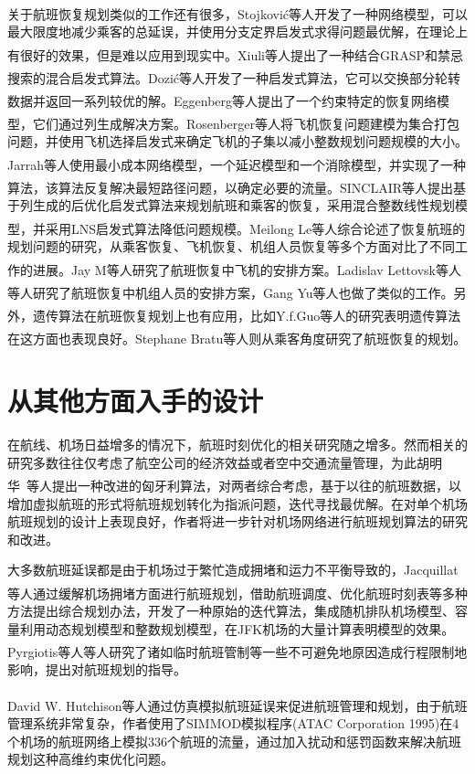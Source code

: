 \documentclass[runningheads]{llncs}
\newcommand{\upcite}[1]{\textsuperscript{\textsuperscript{\cite{#1}}}}
\begin{document}
关于航班恢复规划类似的工作还有很多，Stojković等人\upcite{ref_article26}开发了一种网络模型，可以最大限度地减少乘客的总延误，并使用分支定界启发式求得问题最优解，在理论上有很好的效果，但是难以应用到现实中。Xiuli等人\upcite{ref_article27}提出了一种结合GRASP和禁忌搜索的混合启发式算法。Dozić等人\upcite{ref_article28}开发了一种启发式算法，它可以交换部分轮转数据并返回一系列较优的解。Eggenberg等人\upcite{ref_article29}提出了一个约束特定的恢复网络模型，它们通过列生成解决方案。Rosenberger等人\upcite{ref_article30}将飞机恢复问题建模为集合打包问题，并使用飞机选择启发式来确定飞机的子集以减小整数规划问题规模的大小。Jarrah等人\upcite{ref_article31}使用最小成本网络模型，一个延迟模型和一个消除模型，并实现了一种算法，该算法反复解决最短路径问题，以确定必要的流量。SINCLAIR等人\upcite{ref_article4}提出基于列生成的后优化启发式算法来规划航班和乘客的恢复，采用混合整数线性规划模型，并采用LNS启发式算法降低问题规模。Meilong Le等人\upcite{ref_article8}综合论述了恢复航班的规划问题的研究，从乘客恢复、飞机恢复、机组人员恢复等多个方面对比了不同工作的进展。Jay M等人\upcite{ref_article37}研究了航班恢复中飞机的安排方案。Ladislav Lettovsk等人\upcite{ref_article38}等人研究了航班恢复中机组人员的安排方案，Gang Yu等人\upcite{ref_article39}也做了类似的工作。另外，遗传算法在航班恢复规划上也有应用，比如Y.f.Guo\upcite{ref_article40}等人的研究表明遗传算法在这方面也表现良好。Stephane Bratu等人\upcite{ref_article41}则从乘客角度研究了航班恢复的规划。

\section{从其他方面入手的设计}
在航线、机场日益增多的情况下，航班时刻优化的相关研究随之增多。然而相关的研究多数往往仅考虑了航空公司的经济效益或者空中交通流量管理，为此胡明华\ 等人提出一种改进的匈牙利算法\upcite{ref_article1}，对两者综合考虑，基于以往的航班数据，以增加虚拟航班的形式将航班规划转化为指派问题，迭代寻找最优解。在对单个机场航班规划的设计上表现良好，作者将进一步针对机场网络进行航班规划算法的研究和改进。

大多数航班延误都是由于机场过于繁忙造成拥堵和运力不平衡导致的，Jacquillat等人\upcite{ref_article6}通过缓解机场拥堵方面进行航班规划，借助航班调度、优化航班时刻表等多种方法提出综合规划办法，开发了一种原始的迭代算法，集成随机排队机场模型、容量利用动态规划模型和整数规划模型，在JFK机场的大量计算表明模型的效果。Pyrgiotis等人\upcite{ref_article7}等人研究了诸如临时航班管制等一些不可避免地原因造成行程限制地影响，提出对航班规划的指导。

David W. Hutchison等人\upcite{ref_article17}通过仿真模拟航班延误来促进航班管理和规划，由于航班管理系统非常复杂，作者使用了SIMMOD模拟程序(ATAC Corporation 1995)在4个机场的航班网络上模拟336个航班的流量，通过加入扰动和惩罚函数来解决航班规划这种高维约束优化问题。
\end{document}
